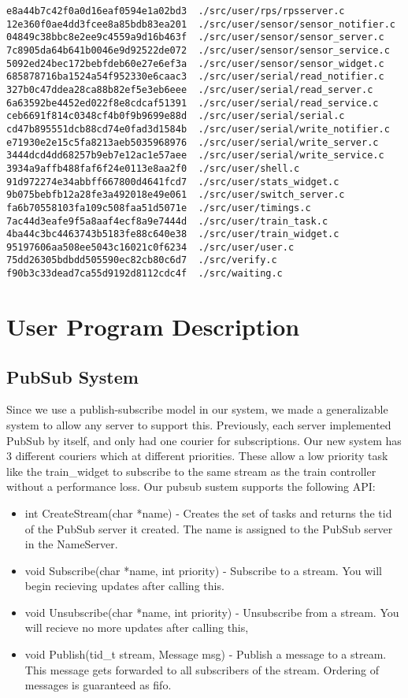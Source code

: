 \documentclass{article}
\begin{document}
\begin{verbatim}
e8a44b7c42f0a0d16eaf0594e1a02bd3  ./src/user/rps/rpsserver.c
12e360f0ae4dd3fcee8a85bdb83ea201  ./src/user/sensor/sensor_notifier.c
04849c38bbc8e2ee9c4559a9d16b463f  ./src/user/sensor/sensor_server.c
7c8905da64b641b0046e9d92522de072  ./src/user/sensor/sensor_service.c
5092ed24bec172bebfdeb60e27e6ef3a  ./src/user/sensor/sensor_widget.c
685878716ba1524a54f952330e6caac3  ./src/user/serial/read_notifier.c
327b0c47ddea28ca88b82ef5e3eb6eee  ./src/user/serial/read_server.c
6a63592be4452ed022f8e8cdcaf51391  ./src/user/serial/read_service.c
ceb6691f814c0348cf4b0f9b9699e88d  ./src/user/serial/serial.c
cd47b895551dcb88cd74e0fad3d1584b  ./src/user/serial/write_notifier.c
e71930e2e15c5fa8213aeb5035968976  ./src/user/serial/write_server.c
3444dcd4dd68257b9eb7e12ac1e57aee  ./src/user/serial/write_service.c
3934a9affb488faf6f24e0113e8aa2f0  ./src/user/shell.c
91d972274e34abbff667800d4641fcd7  ./src/user/stats_widget.c
9b075bebfb12a28fe3a492018e49e061  ./src/user/switch_server.c
fa6b70558103fa109c508faa51d5071e  ./src/user/timings.c
7ac44d3eafe9f5a8aaf4ecf8a9e7444d  ./src/user/train_task.c
4ba44c3bc4463743b5183fe88c640e38  ./src/user/train_widget.c
95197606aa508ee5043c16021c0f6234  ./src/user/user.c
75dd26305bdbdd505590ec82cb80c6d7  ./src/verify.c
f90b3c33dead7ca55d9192d8112cdc4f  ./src/waiting.c
\end{verbatim}

\section{User Program Description}

\subsection{PubSub System}

Since we use a publish-subscribe model in our system, we made a generalizable system to allow any server to support this. Previously, each server implemented PubSub by itself, and only had one courier for subscriptions. Our new system has 3 different couriers which at different priorities. These allow a low priority task like the train\_widget to subscribe to the same stream as the train controller without a performance loss. Our pubsub sustem supports the following API:

\begin{itemize}
  \item int CreateStream(char *name) - Creates the set of tasks and returns the tid of the PubSub server it created. The name is assigned to the PubSub server in the NameServer.
  \item void Subscribe(char *name, int priority) - Subscribe to a stream. You will begin recieving updates after calling this.
  \item void Unsubscribe(char *name, int priority) - Unsubscribe from a stream. You will recieve no more updates after calling this,
  \item void Publish(tid\_t stream, Message msg) - Publish a message to a stream. This message gets forwarded to all subscribers of the stream. Ordering of messages is guaranteed as fifo.
\end{itemize}
\end{document}
